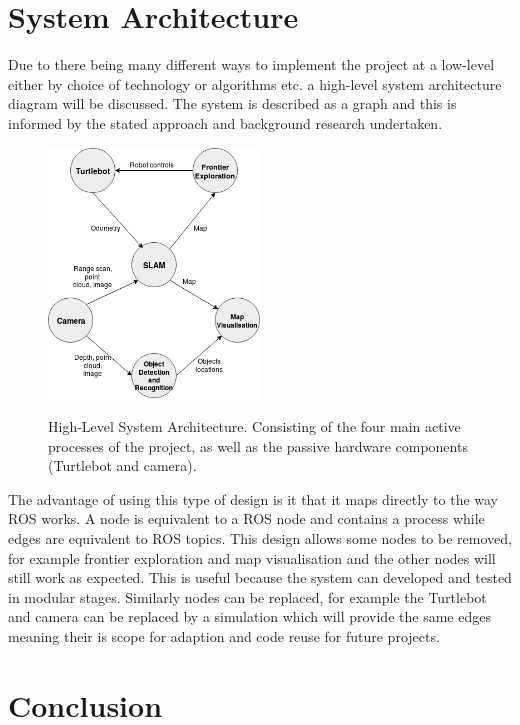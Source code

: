 \documentclass{mproj}
\begin{document}
\section{System Architecture}

Due to there being many different ways to implement the project at a low-level either by choice of technology or algorithms etc. a high-level system architecture diagram will be discussed. The system is described as a graph and this is informed by the stated approach and background research undertaken.

\begin{figure}[h]
  \caption{High-Level System Architecture. Consisting of the four main active processes of the project, as well as the passive hardware components (Turtlebot and camera).}
  \centering
  \includegraphics[width=0.5\textwidth]{images/system-diagram.png}
  \label{fig:System Diagram}
\end{figure}

The advantage of using this type of design is it that it maps directly to the way ROS works. A node is equivalent to a ROS node and contains a process while edges are equivalent to ROS topics. This design allows some nodes to be removed, for example frontier exploration and map visualisation and the other nodes will still work as expected. This is useful because the system can developed and tested in modular stages. Similarly nodes can be replaced, for example the Turtlebot and camera can be replaced by a simulation which will provide the same edges meaning their is scope for adaption and code reuse for future projects.

\section{Conclusion}
\end{document}
